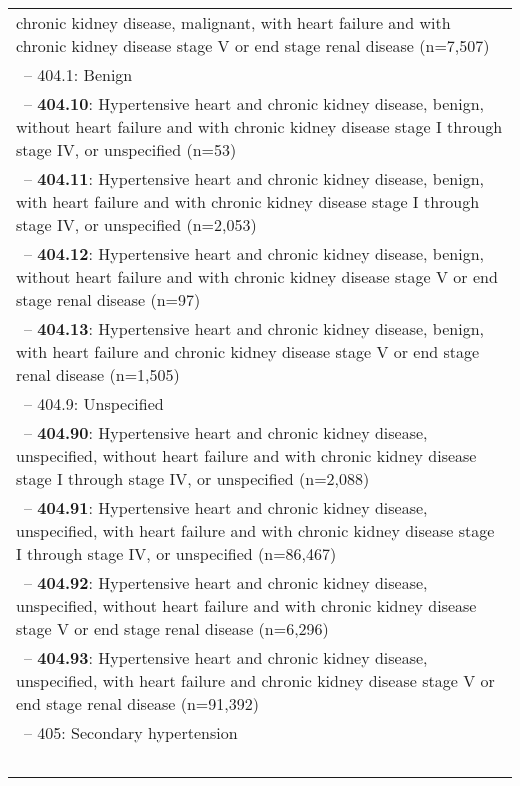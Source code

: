 \begin{longtable}{p{\textwidth}}
chronic kidney disease, malignant, with heart failure and with chronic kidney disease stage V or end stage renal disease (n=7,507)} \\ \-\ \hspace{30pt}\footnotesize{-- 404.1: Benign} \\ \-\ \hspace{40pt}\footnotesize{-- {\color{ForestGreen} \textbf{404.10}}: Hypertensive heart and chronic kidney disease, benign, without heart failure and with chronic kidney disease stage I through stage IV, or unspecified (n=53)} \\ \-\ \hspace{40pt}\footnotesize{-- {\color{ForestGreen} \textbf{404.11}}: Hypertensive heart and chronic kidney disease, benign, with heart failure and with chronic kidney disease stage I through stage IV, or unspecified (n=2,053)} \\ \-\ \hspace{40pt}\footnotesize{-- {\color{ForestGreen} \textbf{404.12}}: Hypertensive heart and chronic kidney disease, benign, without heart failure and with chronic kidney disease stage V or end stage renal disease (n=97)} \\ \-\ \hspace{40pt}\footnotesize{-- {\color{ForestGreen} \textbf{404.13}}: Hypertensive heart and chronic kidney disease, benign, with heart failure and chronic kidney disease stage V or end stage renal disease (n=1,505)} \\ \-\ \hspace{30pt}\footnotesize{-- 404.9: Unspecified} \\ \-\ \hspace{40pt}\footnotesize{-- {\color{ForestGreen} \textbf{404.90}}: Hypertensive heart and chronic kidney disease, unspecified, without heart failure and with chronic kidney disease stage I through stage IV, or unspecified (n=2,088)} \\ \-\ \hspace{40pt}\footnotesize{-- {\color{ForestGreen} \textbf{404.91}}: Hypertensive heart and chronic kidney disease, unspecified, with heart failure and with chronic kidney disease stage I through stage IV, or unspecified (n=86,467)} \\ \-\ \hspace{40pt}\footnotesize{-- {\color{ForestGreen} \textbf{404.92}}: Hypertensive heart and chronic kidney disease, unspecified, without heart failure and with chronic kidney disease stage V or end stage renal disease (n=6,296)} \\ \-\ \hspace{40pt}\footnotesize{-- {\color{ForestGreen} \textbf{404.93}}: Hypertensive heart and chronic kidney disease, unspecified, with heart failure and chronic kidney disease stage V or end stage renal disease (n=91,392)} \\ \-\ \hspace{20pt}\footnotesize{-- 405: Secondary hypertension} \\ \-\ \hspace{30pt}\footnotesize{-- 
\end{longtable}
